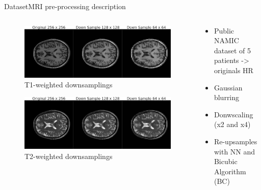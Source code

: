 \documentclass[10pt, unicode]{beamer}
\begin{document}
\begin{frame}{Dataset}{MRI pre-processing description}
  
  \begin{columns}
    
    \begin{column}{0.5\textwidth}
      \vspace{-0.5cm}
      \begin{figure}
        \includegraphics[scale=0.13]{./images/donwsamples.png}
        \caption{T1-weighted downsamplings}
      \end{figure}
      \begin{figure}
        \vspace{-1cm}
        \includegraphics[scale=0.13]{./images/donwsamples_t2.png}
        \caption{T2-weighted downsamplings}
      \end{figure}
    \end{column}

    \begin{column}{0.4\textwidth}
      \vspace{-1.5cm}
      \begin{itemize}
        \item Public NAMIC dataset of 5 patients -> originals HR
        \item Gaussian blurring
        \item Donwscaling (x2 and x4)
        \item Re-upsamples with NN and Bicubic Algorithm (BC)
      \end{itemize}
    \end{column}
  
  \end{columns}

\end{frame}
\end{document}
